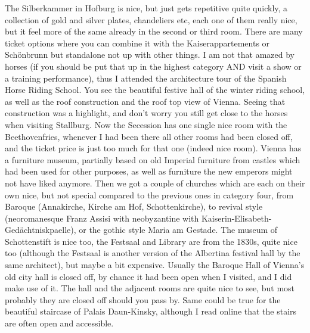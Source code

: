 The Silberkammer in Hofburg is nice, but just gets repetitive quite quickly, a collection of gold and silver plates, chandeliers etc, each one of them really nice, but it feel more of the same already in the second or third room. There are many ticket options where you can combine it with the Kaiserappartements or Sch\"onbrunn but standalone not up with other things. I am not that amazed by horses (if you should be put that up in the highest category AND visit a show or a training performance), thus I attended the architecture tour of the Spanish Horse Riding School. You see the beautiful festive hall of the winter riding school, as well as the roof construction and the roof top view of Vienna. Seeing that construction was a highlight, and don't worry you still get close to the horses when visiting Stallburg. Now the Secession has one single nice room with the Beethovenfries, whenever I had been there all other rooms had been closed off, and the ticket price is just too much for that one (indeed nice room). Vienna has a furniture museum, partially based on old Imperial furniture from castles which had been used for other purposes, as well as furniture the new emperors might not have liked anymore. Then we got a couple of churches which are each on their own nice, but not special compared to the previous ones in category four, from Baroque (Annakirche, Kirche am Hof, Schottenkirche), to revival style (neoromanesque Franz Assisi with neobyzantine with Kaiserin-Elisabeth-Ged\"achtniskpaelle), or the gothic style Maria am Gestade. The museum of Schottenstift is nice too, the Festsaal and Library are from the 1830s, quite nice too (although the Festsaal is another version of the Albertina festival hall by the same architect), but maybe a bit expensive. Usually the Baroque Hall of Vienna's old city hall is closed off, by chance it had been open when I visited, and I did make use of it. The hall and the adjacent rooms are quite nice to see, but most probably they are closed off should you pass by. Same could be true for the beautiful staircase of Palais Daun-Kinsky, although I read online that the stairs are often open and accessible.\\

